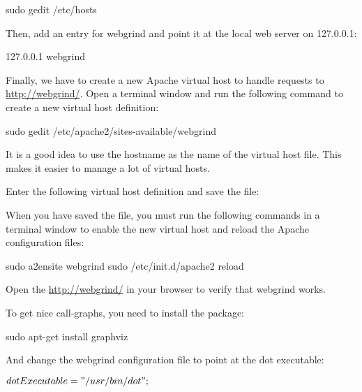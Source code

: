 \documentclass[draft,ebook,10pt,twoside,openright]{memoir}
\begin{document}
\begin{squashboxcommand}
sudo gedit /etc/hosts
\end{squashboxcommand}

Then, add an entry for webgrind and point it at the local web server on 127.0.0.1:

\begin{squashboxoutput}
127.0.0.1   webgrind
\end{squashboxoutput}

Finally, we have to create a new Apache virtual host to handle requests to \url{http://webgrind/}. Open a terminal window and run the following command to create a new virtual host definition:

\begin{squashboxcommand}
sudo gedit /etc/apache2/sites-available/webgrind
\end{squashboxcommand}

It is a good idea to use the hostname as the name of the virtual host file. This makes it easier to manage a lot of virtual hosts.

Enter the following virtual host definition and save the file:

\begin{squashboxoutput}
\end{squashboxoutput}

When you have saved the file, you must run the following commands in a terminal window to enable the new virtual host and reload the Apache configuration files:

\begin{squashboxcommand}
sudo a2ensite webgrind
sudo /etc/init.d/apache2 reload
\end{squashboxcommand}

Open the \url{http://webgrind/} in your browser to verify that webgrind works.

  To get nice call-graphs, you need to install the package:

\begin{squashboxcommand}
sudo apt-get install graphviz
\end{squashboxcommand}

And change the webgrind configuration file to point at the dot executable:

\begin{squashboxoutput}
$dotExecutable = "/usr/bin/dot";
$
\end{squashboxoutput}
\end{document}
